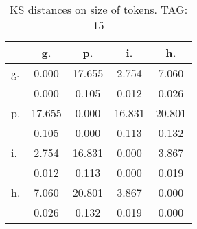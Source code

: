 \begin{table}[h!]
\begin{center}
\begin{tabular}{| l | c | c | c | c |}\hline
 & g. & p. & i. & h. \\\hline
g. & 0.000  & 17.655  & 2.754  & 7.060 \\\hline
 & 0.000  & 0.105  & 0.012  & 0.026 \\\hline
p. & 17.655  & 0.000  & 16.831  & 20.801 \\\hline
 & 0.105  & 0.000  & 0.113  & 0.132 \\\hline
i. & 2.754  & 16.831  & 0.000  & 3.867 \\\hline
 & 0.012  & 0.113  & 0.000  & 0.019 \\\hline
h. & 7.060  & 20.801  & 3.867  & 0.000 \\\hline
 & 0.026  & 0.132  & 0.019  & 0.000 \\\hline
\end{tabular}
\caption{KS distances on size of tokens. TAG: 15}
\end{center}
\end{table}